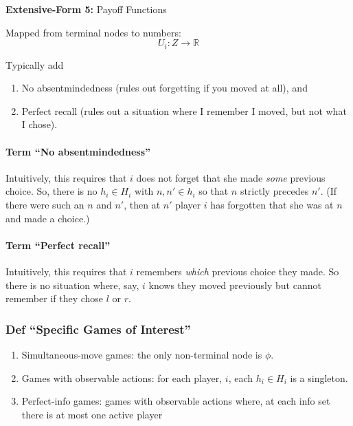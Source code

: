 \documentclass[
]{article}
\providecommand{\tightlist}{%
  \setlength{\itemsep}{0pt}\setlength{\parskip}{0pt}}
\begin{document}
\textbf{Extensive-Form 5:} Payoff Functions

Mapped from terminal nodes to numbers: \[U_i: Z \rightarrow \mathbb{R}\]

Typically add

\begin{enumerate}
\def\labelenumi{\arabic{enumi}.}
\tightlist
\item
  No absentmindedness (rules out forgetting if you moved at all), and
\item
  Perfect recall (rules out a situation where I remember I moved, but
  not what I chose).
\end{enumerate}

\hypertarget{term-no-absentmindedness}{%
\paragraph{Term ``No
absentmindedness''}\label{term-no-absentmindedness}}

Intuitively, this requires that \(i\) does not forget that she made
\emph{some} previous choice. So, there is no \(h_i \in H_i\) with
\(n, n' \in h_i\) so that \(n\) strictly precedes \(n'\). (If there were
such an \(n\) and \(n'\), then at \(n'\) player \(i\) has forgotten that
she was at \(n\) and made a choice.)

\hypertarget{term-perfect-recall}{%
\paragraph{Term ``Perfect recall''}\label{term-perfect-recall}}

Intuitively, this requires that \(i\) remembers \emph{which} previous
choice they made. So there is no situation where, say, \(i\) knows they
moved previously but cannot remember if they chose \(l\) or \(r\).

\hypertarget{def-specific-games-of-interest}{%
\subsubsection{Def ``Specific Games of
Interest''}\label{def-specific-games-of-interest}}

\begin{enumerate}
\def\labelenumi{\arabic{enumi}.}
\tightlist
\item
  Simultaneous-move games: the only non-terminal node is \(\phi\).
\item
  Games with observable actions: for each player, \(i\), each
  \(h_i \in H_i\) is a singleton.
\item
  Perfect-info games: games with observable actions where, at each info
  set there is at most one active player
\end{enumerate}
\end{document}

